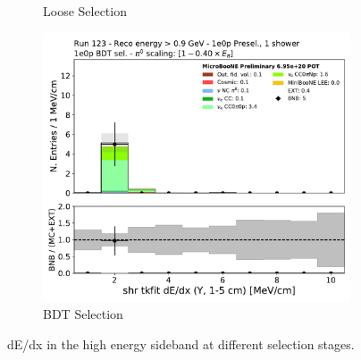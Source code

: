 \begin{figure}[H]
\begin{subfigure}{0.3\textwidth}
    \caption{Loose Selection}
    \end{subfigure}
    \begin{subfigure}{0.3\textwidth}
    \includegraphics[width=1.0\textwidth]{1e0p/High_E_Sideband/BDT_selection/shr_tkfit_gap10_dedx_Y.pdf}
    \caption{BDT Selection}
    \end{subfigure}
    \caption{dE/dx in the high energy sideband at different selection stages.} 
    \label{fig:1e0p:High_E_sideband:dedx}
\end{figure}

